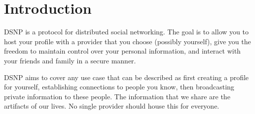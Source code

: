 \documentclass[letterpaper,11pt,oneside]{article}
\begin{document}

\section{Introduction}

%
%
%
%
% 


DSNP is a protocol for distributed social networking. The goal is to allow you
to host your profile with a provider that you choose (possibly yourself), give
you the freedom to maintain control over your personal information, and
interact with your friends and family in a secure manner.

DSNP aims to cover any use case that can be described as first creating a
profile for yourself, establishing connections to people you know, then
broadcasting private information to these people. The information that we share
are the artifacts of our lives. No single provider should house this for
everyone.
\end{document}
